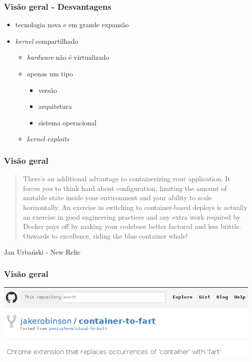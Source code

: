 \documentclass{beamer}
\begin{document}
\begin{frame}
    \frametitle{Visão geral - Desvantagens}
    \begin{itemize}
        \item tecnologia nova e em grande expansão
        \item \textit{kernel} compartilhado
        \begin{itemize}
            \item \textit{hardware} não é virtualizado
            \item apenas um tipo
            \begin{itemize}
                \item versão
                \item arquitetura
                \item sistema operacional
            \end{itemize}
            \item \textit{kernel exploits}
        \end{itemize}
    \end{itemize}
\end{frame}

\begin{frame}
    \frametitle{Visão geral}
    \begin{quote}
        There’s an additional advantage to containerizing your application. It
        forces you to think hard about configuration, limiting the amount of
        mutable state inside your environment and your ability to scale
        horizontally. An exercise in switching to container-based deploys is
        actually an exercise in good engineering practices and any extra work
        required by Docker pays off by making your codebase better factored and
        less brittle. Onwards to excellence, riding the blue container whale!
    \end{quote}
    Jan Urbański - New Relic
\end{frame}

\begin{frame}
    \frametitle{Visão geral}
    \centering
    \includegraphics[width=0.8\linewidth]{img/chrome_extension.png}
\end{frame}
\end{document}
